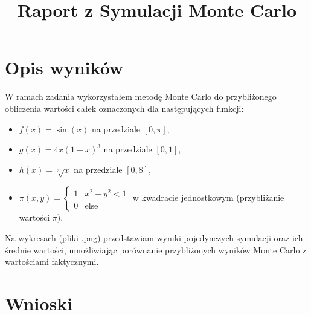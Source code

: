 \documentclass{article}
\title{Raport z Symulacji Monte Carlo}
\author{}
\date{}
\begin{document}
\maketitle

\section*{Opis wyników}

W ramach zadania wykorzystałem metodę Monte Carlo do przybliżonego obliczenia wartości całek oznaczonych dla następujących funkcji:
\begin{itemize}
    \item \( f(x) = \sin(x) \) na przedziale \( [0, \pi] \),
    \item \( g(x) = 4x(1 - x)^3 \) na przedziale \( [0, 1] \),
    \item \( h(x) = \sqrt[3]{x} \) na przedziale \( [0, 8] \),
    \item \( \pi(x, y) = \begin{cases} 1 & \text{} x^2 + y^2 < 1 \\ 0 & \text{else} \end{cases} \) w kwadracie jednostkowym (przybliżanie wartości \(\pi\)).
\end{itemize}

Na wykresach (pliki .png) przedstawiam wyniki pojedynczych symulacji oraz ich średnie wartości, umożliwiając porównanie przybliżonych wyników Monte Carlo z wartościami faktycznymi.

\section*{Wnioski}
\end{document}
